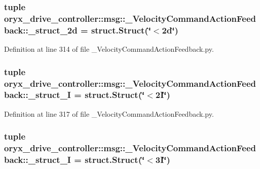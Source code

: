 \subsubsection[{\-\_\-struct\-\_\-2d}]{\setlength{\rightskip}{0pt plus 5cm}tuple {\bf oryx\-\_\-drive\-\_\-controller\-::msg\-::\-\_\-\-Velocity\-Command\-Action\-Feedback\-::\-\_\-struct\-\_\-2d} = struct.\-Struct(\char`\"{}$<$2d\char`\"{})}\label{namespaceoryx__drive__controller_1_1msg_1_1__VelocityCommandActionFeedback_a0c4750fd605826342eb8ab667eb28ba5}


\-Definition at line 314 of file \-\_\-\-Velocity\-Command\-Action\-Feedback.\-py.

\subsubsection[{\-\_\-struct\-\_\-2\-I}]{\setlength{\rightskip}{0pt plus 5cm}tuple {\bf oryx\-\_\-drive\-\_\-controller\-::msg\-::\-\_\-\-Velocity\-Command\-Action\-Feedback\-::\-\_\-struct\-\_\-I} = struct.\-Struct(\char`\"{}$<$2\-I\char`\"{})}\label{namespaceoryx__drive__controller_1_1msg_1_1__VelocityCommandActionFeedback_a0791238501a0887817ce944af6a93b15}


\-Definition at line 317 of file \-\_\-\-Velocity\-Command\-Action\-Feedback.\-py.

\subsubsection[{\-\_\-struct\-\_\-3\-I}]{\setlength{\rightskip}{0pt plus 5cm}tuple {\bf oryx\-\_\-drive\-\_\-controller\-::msg\-::\-\_\-\-Velocity\-Command\-Action\-Feedback\-::\-\_\-struct\-\_\-I} = struct.\-Struct(\char`\"{}$<$3\-I\char`\"{})}\label{namespaceoryx__drive__controller_1_1msg_1_1__VelocityCommandActionFeedback_a1321c83fd9345e43fd9ef6f810066e93}


